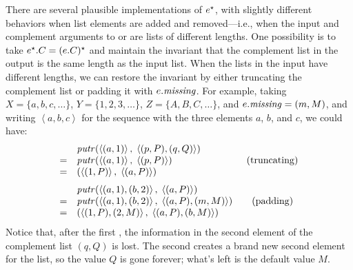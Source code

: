 There are several plausible implementations of
$e^\star$, with slightly different behaviors when list elements are
added and removed---i.e., when the input and complement arguments to \PUTR{}
or \PUTL{} are lists
of different lengths.  One possibility is to take $e^\star.C = (e.C)^\star$
and maintain the invariant that the complement list in the output is the same length as
the input list. When the lists in the input have different lengths, we can
restore the
invariant by either truncating the complement list or padding it with
$e.\mathit{missing}$.
For example, taking $X = \{a,b,c,\ldots\}$, $Y = \{1,2,3,\ldots\}$, $Z =
\{A,B,C,\ldots\}$, and $e.\mathit{missing} = (m,M)$, and writing
$\left<a,b,c\right>$ for the sequence with the three elements $a$, $b$, and
$c$, we could have:
\[
\begin{array}{ll}
& \mathit{putr} (\left<(a,1)\right>,\;
         \left<(p,P),(q,Q)\right>)
\\
= &\mathit{putr} (\left<(a,1)\right>,\;
         \left<(p,P)\right>)\mbox{\hspace{7.7em}(truncating)}
\\
= & ( \left<(1,P)\right>,\; \left<(a,P)\right>)
\\ [1.5ex]
& \mathit{putr} (\left<(a,1),(b,2)\right>,\;
         \left<(a,P)\right>)
\\
= &\mathit{putr} (\left<(a,1),(b,2)\right>,\;
         \left<(a,P),(m,M)\right>)\mbox{\qquad(padding)}
\\
= & (\left<(1,P),(2,M)\right>,\;
         \left<(a,P),(b,M)\right>)
\end{array}
\]
Notice that, after the first \PUTR{}, the information in the second
element of the complement list $(q,Q)$ is lost.
The second \PUTR{} creates a brand new second element for the list, so the value $Q$ is
gone forever; what's left is the default value $M$.

